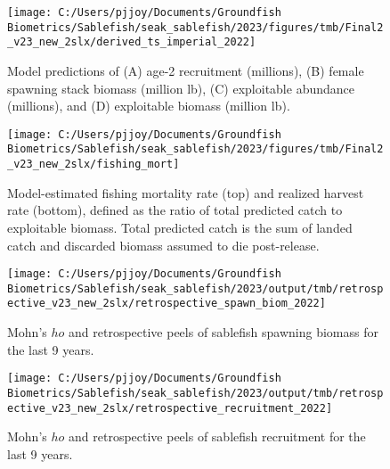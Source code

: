\documentclass[
]{article}
\begin{document}
\begin{figure}[H]
\texttt{[image: C:/Users/pjjoy/Documents/Groundfish Biometrics/Sablefish/seak\_sablefish/2023/figures/tmb/Final2\_v23\_new\_2slx/derived\_ts\_imperial\_2022]} \caption{Model predictions of (A) age-2 recruitment (millions), (B) female spawning stack biomass (million lb), (C) exploitable abundance (millions), and (D) exploitable biomass (million lb).}\label{fig:derivedts}
\end{figure}

\begin{figure}[H]
\texttt{[image: C:/Users/pjjoy/Documents/Groundfish Biometrics/Sablefish/seak\_sablefish/2023/figures/tmb/Final2\_v23\_new\_2slx/fishing\_mort]} \caption{Model-estimated fishing mortality rate (top) and realized harvest rate (bottom), defined as the ratio of total predicted catch to exploitable biomass. Total predicted catch is the sum of landed catch and discarded biomass assumed to die post-release.}\label{fig:fishmort}
\end{figure}

\begin{figure}[H]
\texttt{[image: C:/Users/pjjoy/Documents/Groundfish Biometrics/Sablefish/seak\_sablefish/2023/output/tmb/retrospective\_v23\_new\_2slx/retrospective\_spawn\_biom\_2022]} \caption{Mohn's $ho$ and retrospective peels of sablefish spawning biomass for the last 9 years.}\label{fig:mohnsbiom}
\end{figure}

\begin{figure}[H]
\texttt{[image: C:/Users/pjjoy/Documents/Groundfish Biometrics/Sablefish/seak\_sablefish/2023/output/tmb/retrospective\_v23\_new\_2slx/retrospective\_recruitment\_2022]} \caption{Mohn's $ho$ and retrospective peels of sablefish recruitment for the last 9 years.}\label{fig:mohnsrec}
\end{figure}
\end{document}
